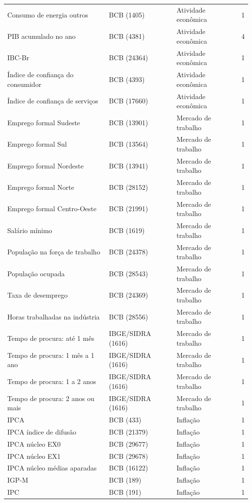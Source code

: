 \documentclass[preprint,authoryear,review,12pt]{elsarticle}
\begin{document}
\begin{ThreePartTable}
\begin{longtable}{@{}p{5.2cm} l l c@{}}
Consumo de energia outros & BCB (1405) & Atividade econômica & 1 \\
PIB acumulado no ano & BCB (4381) & Atividade econômica & 4 \\
IBC-Br & BCB (24364) & Atividade econômica & 1 \\
Índice de confiança do consumidor & BCB (4393) & Atividade econômica & 1 \\
Índice de confiança de serviços & BCB (17660) & Atividade econômica & 1 \\
Emprego formal Sudeste & BCB (13901) & Mercado de trabalho & 1 \\
Emprego formal Sul & BCB (13564) & Mercado de trabalho & 1 \\
Emprego formal Nordeste & BCB (13941) & Mercado de trabalho & 1 \\
Emprego formal Norte & BCB (28152) & Mercado de trabalho & 1 \\
Emprego formal Centro-Oeste & BCB (21991) & Mercado de trabalho & 1 \\
Salário mínimo & BCB (1619) & Mercado de trabalho & 1 \\
População na força de trabalho & BCB (24378) & Mercado de trabalho & 1 \\
População ocupada & BCB (28543) & Mercado de trabalho & 1 \\
Taxa de desemprego & BCB (24369) & Mercado de trabalho & 1 \\
Horas trabalhadas na indústria & BCB (28556) & Mercado de trabalho & 1 \\
Tempo de procura: até 1 mês & IBGE/SIDRA (1616) & Mercado de trabalho & 1 \\
Tempo de procura: 1 mês a 1 ano & IBGE/SIDRA (1616) & Mercado de trabalho & 1 \\
Tempo de procura: 1 a 2 anos & IBGE/SIDRA (1616) & Mercado de trabalho & 1 \\
Tempo de procura: 2 anos ou mais & IBGE/SIDRA (1616) & Mercado de trabalho & 1 \\
IPCA & BCB (433) & Inflação & 1 \\
IPCA índice de difusão & BCB (21379) & Inflação & 1 \\
IPCA núcleo EX0 & BCB (29677) & Inflação & 1 \\
IPCA núcleo EX1 & BCB (29678) & Inflação & 1 \\
IPCA núcleo médias aparadas & BCB (16122) & Inflação & 1 \\
IGP-M & BCB (189) & Inflação & 1 \\
IPC & BCB (191) & Inflação & 1 \\

\end{longtable}
\end{ThreePartTable}
\end{document}
